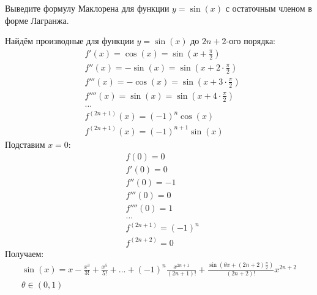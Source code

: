 \begin{question}
    Выведите формулу Маклорена для функции $y = \sin(x)$ с остаточным членом в форме Лагранжа.
\end{question}
\begin{answer}
    Найдём производные для функции $y = \sin(x)$ до $2n+2$-ого порядка:
    \begin{align*}
        &f'(x) = \cos(x) = \sin(x + \frac{\pi}{2}) \\
        &f''(x) = -\sin(x) = \sin(x + 2 \cdot \frac{\pi}{2}) \\
        &f'''(x) = -\cos(x) = \sin(x + 3 \cdot \frac{\pi}{2}) \\
        &f''''(x) = \sin(x) = \sin(x + 4 \cdot \frac{\pi}{2}) \\
        &\ldots \\
        &f ^{(2n+1)}(x) = (-1) ^{n} \cos(x) \\
        &f ^{(2n+1)}(x) = (-1) ^{n+1} \sin(x)
    \end{align*}
    Подставим $x = 0$:
    \begin{align*}
        &f(0) = 0 \\
        &f'(0) = 0 \\
        &f''(0) = -1 \\
        &f'''(0) = 0 \\
        &f''''(0) = 1 \\
        &\ldots \\
        &f ^{(2n+1)} = (-1)^{n} \\
        &f ^{(2n+2)} = 0
    \end{align*}
    Получаем:
    \begin{gather*}
        \sin(x) = x - \frac{x^3}{3!} + \frac{x^5}{5!} + \ldots + (-1)^{n} \frac{x ^{2n+1}}{(2n+1)!} + \frac{\sin\left(\theta x + (2n+2) \frac{\pi}{2}\right)}{(2n+2)!} x ^{2n+2} \\
        \theta \in (0, 1)
    \end{gather*}
\end{answer}
\pagebreak



